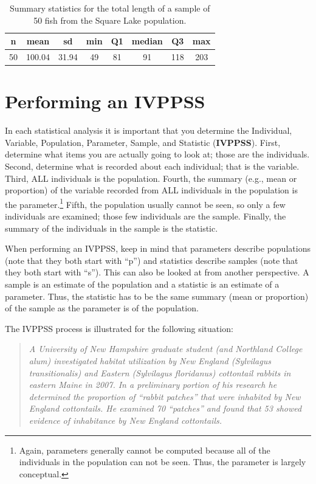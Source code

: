 \documentclass[10pt,openany]{book}\usepackage[]{graphicx}\usepackage[]{color}
\begin{document}
\begin{table}[ht]
\centering
\caption{Summary statistics for the total length of a sample of 50 fish from the Square Lake population.} 
\label{tab:SquareLakeSample1}
\begin{tabular}{cccccccc}
 n & mean & sd & min & Q1 & median & Q3 & max \\ 
  \hline
50 & 100.04 & 31.94 & 49 & 81 & 91 & 118 & 203 \\ 
   \hline
\end{tabular}
\end{table}



\vspace{-12pt}


\section{Performing an IVPPSS}
\vspace{-12pt}
In each statistical analysis it is important that you determine the Individual, Variable, Population, Parameter, Sample, and Statistic (\textbf{IVPPSS}). First, determine what items you are actually going to look at; those are the individuals. Second, determine what is recorded about each individual; that is the variable. Third, ALL individuals is the population. Fourth, the summary (e.g., mean or proportion) of the variable recorded from ALL individuals in the population is the parameter.\footnote{Again, parameters generally cannot be computed because all of the individuals in the population can not be seen. Thus, the parameter is largely conceptual.} Fifth, the population usually cannot be seen, so only a few individuals are examined; those few individuals are the sample. Finally, the summary of the individuals in the sample is the statistic.

When performing an IVPPSS, keep in mind that parameters describe populations (note that they both start with ``p'') and statistics describe samples (note that they both start with ``s''). This can also be looked at from another perspective. A sample is an estimate of the population and a statistic is an estimate of a parameter. Thus, the statistic has to be the same summary (mean or proportion) of the sample as the parameter is of the population.

The IVPPSS process is illustrated for the following situation:
\vspace{-6pt}
\begin{quote}
\textit{A University of New Hampshire graduate student (and Northland College alum) investigated habitat utilization by New England (Sylvilagus transitionalis) and Eastern (Sylvilagus floridanus) cottontail rabbits in eastern Maine in 2007. In a preliminary portion of his research he determined the proportion of ``rabbit patches'' that were inhabited by New England cottontails. He examined 70 ``patches'' and found that 53 showed evidence of inhabitance by New England cottontails.}
\end{quote}
\vspace{-6pt}
\end{document}
